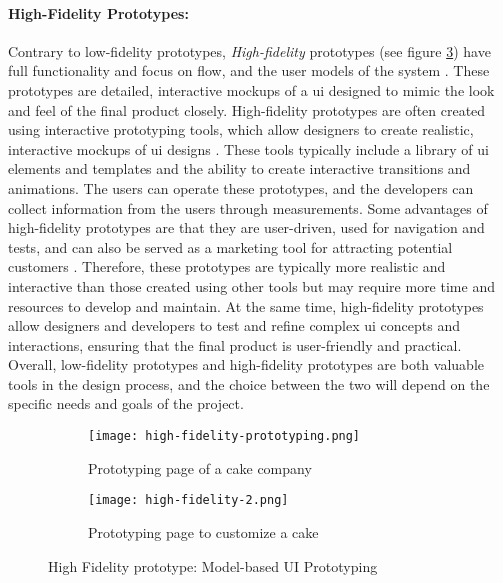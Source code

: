 \paragraph*{High-Fidelity Prototypes:}
Contrary to low-fidelity prototypes, \textit{High-fidelity} prototypes (see figure \ref{fig:background:uiPrototyping}) have full functionality and focus on flow, and the user models of the system \cite{article:prototyping:exploratory}.
These prototypes are detailed, interactive mockups of a \ac{ui} designed to mimic the look and feel of the final product closely.
High-fidelity prototypes are often created using interactive prototyping tools, which allow designers to create realistic, interactive mockups of \ac{ui} designs \cite{article:prototyping:weichbroth}. 
These tools typically include a library of \ac{ui} elements and templates and the ability to create interactive transitions and animations.
The users can operate these prototypes, and the developers can collect information from the users through measurements.
Some advantages of high-fidelity prototypes are that they are user-driven, used for navigation and tests, and can also be served as a marketing tool for attracting potential customers \cite{article:prototyping:highlowfidelity}.
Therefore, these prototypes are typically more realistic and interactive than those created using other tools but may require more time and resources to develop and maintain.
At the same time, high-fidelity prototypes allow designers and developers to test and refine complex \ac{ui} concepts and interactions, ensuring that the final product is user-friendly and practical.
Overall, low-fidelity prototypes and high-fidelity prototypes are both valuable tools in the design process, and the choice between the two will depend on the specific needs and goals of the project.
\begin{figure}[htbp]
  \begin{subfigure}[b]{0.5\textwidth}
    \centering
    \texttt{[image: high-fidelity-prototyping.png]}
    \caption{Prototyping page of a cake company}
    \label{fig:background:high1}   
  \end{subfigure}
  \begin{subfigure}[b]{0.5\textwidth}
    \centering
    \texttt{[image: high-fidelity-2.png]}
    \caption{Prototyping page to customize a cake}
    \label{fig:background:high2}   
  \end{subfigure} 
  \caption[High Fidelity prototyping]{High Fidelity prototype: Model-based UI Prototyping \cite{misc:prototyping:hfp}}
  \label{fig:background:uiPrototyping}
\end{figure}

